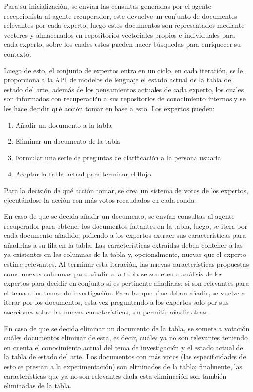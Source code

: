 \documentclass[12pt]{article}
\begin{document}
Para su inicialización, se envían las consultas generadas por el agente recepcionista al agente recuperador, este devuelve un conjunto de documentos relevantes por cada experto, luego estos documentos son representados mediante vectores y almacenados en repositorios vectoriales propios e individuales para cada experto, sobre los cuales estos pueden hacer búsquedas para enriquecer su contexto. 

Luego de esto, el conjunto de expertos entra en un ciclo, en cada iteración, se le proporciona a la API de modelos de lenguaje el estado actual de la tabla del estado del arte, además de los pensamientos actuales de cada experto, los cuales son informados con recuperación a sus repositorios de conocimiento internos y se les hace decidir qué acción tomar en base a esto. Los expertos pueden:

\begin{enumerate}
    \item Añadir un documento a la tabla
    \item Eliminar un documento de la tabla
    \item Formular una serie de preguntas de clarificación a la persona usuaria
    \item Aceptar la tabla actual para terminar el flujo
\end{enumerate}

Para la decisión de qué acción tomar, se crea un sistema de votos de los expertos, ejecutándose la acción con más votos recaudados en cada ronda.

En caso de que se decida añadir un documento, se envían consultas al agente recuperador para obtener los documentos faltantes en la tabla, luego, se itera por cada documento añadido, pidiendo a los expertos extraer sus características para añadirlas a su fila en la tabla. Las características extraídas deben contener a las ya existentes en las columnas de la tabla y, opcionalmente, nuevas que el experto estime relevantes. Al terminar esta iteración, las nuevas características propuestas como nuevas columnas para añadir a la tabla se someten a análisis de los expertos para decidir en conjunto si es pertinente añadirlas: si son relevantes para el tema o los temas de investigación. Para las que sí se deban añadir, se vuelve a iterar por los documentos, esta vez preguntando a los expertos solo por sus aserciones sobre las nuevas características, sin permitir añadir otras.

En caso de que se decida eliminar un documento de la tabla, se somete a votación cuáles documentos eliminar de esta, es decir, cuáles ya no son relevantes teniendo en cuenta el conocimiento actual del tema de investigación y el estado actual de la tabla de estado del arte. Los documentos con más votos (las especificidades de esto se prestan a la experimentación) son eliminados de la tabla; finalmente, las características que ya no son relevantes dada esta eliminación son también eliminadas de la tabla.
\end{document}
